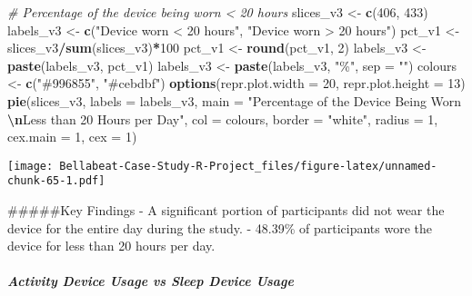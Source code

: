\documentclass[
]{article}
\newenvironment{Shaded}{\begin{snugshade}}{\end{snugshade}}
\newcommand{\AttributeTok}[1]{\textcolor[rgb]{0.13,0.29,0.53}{#1}}
\newcommand{\CommentTok}[1]{\textcolor[rgb]{0.56,0.35,0.01}{\textit{#1}}}
\newcommand{\DecValTok}[1]{\textcolor[rgb]{0.00,0.00,0.81}{#1}}
\newcommand{\FunctionTok}[1]{\textcolor[rgb]{0.13,0.29,0.53}{\textbf{#1}}}
\newcommand{\NormalTok}[1]{#1}
\newcommand{\OtherTok}[1]{\textcolor[rgb]{0.56,0.35,0.01}{#1}}
\newcommand{\SpecialCharTok}[1]{\textcolor[rgb]{0.81,0.36,0.00}{\textbf{#1}}}
\newcommand{\StringTok}[1]{\textcolor[rgb]{0.31,0.60,0.02}{#1}}
\begin{document}
\begin{Shaded}
\begin{Highlighting}[]
\CommentTok{\# Percentage of the device being worn \textless{} 20 hours}
\NormalTok{slices\_v3 }\OtherTok{\textless{}{-}} \FunctionTok{c}\NormalTok{(}\DecValTok{406}\NormalTok{, }\DecValTok{433}\NormalTok{)}
\NormalTok{labels\_v3 }\OtherTok{\textless{}{-}} \FunctionTok{c}\NormalTok{(}\StringTok{"Device worn \textless{} 20 hours"}\NormalTok{, }\StringTok{"Device worn \textgreater{} 20 hours"}\NormalTok{)}
\NormalTok{pct\_v1 }\OtherTok{\textless{}{-}}\NormalTok{ slices\_v3}\SpecialCharTok{/}\FunctionTok{sum}\NormalTok{(slices\_v3)}\SpecialCharTok{*}\DecValTok{100}
\NormalTok{pct\_v1 }\OtherTok{\textless{}{-}} \FunctionTok{round}\NormalTok{(pct\_v1, }\DecValTok{2}\NormalTok{)}
\NormalTok{labels\_v3 }\OtherTok{\textless{}{-}} \FunctionTok{paste}\NormalTok{(labels\_v3, pct\_v1)}
\NormalTok{labels\_v3 }\OtherTok{\textless{}{-}} \FunctionTok{paste}\NormalTok{(labels\_v3, }\StringTok{"\%"}\NormalTok{, }\AttributeTok{sep =} \StringTok{""}\NormalTok{)}
\NormalTok{colours }\OtherTok{\textless{}{-}} \FunctionTok{c}\NormalTok{(}\StringTok{"\#996855"}\NormalTok{, }\StringTok{"\#cebdbf"}\NormalTok{)}
\FunctionTok{options}\NormalTok{(}\AttributeTok{repr.plot.width =} \DecValTok{20}\NormalTok{, }\AttributeTok{repr.plot.height =} \DecValTok{13}\NormalTok{)}
\FunctionTok{pie}\NormalTok{(slices\_v3, }\AttributeTok{labels =}\NormalTok{ labels\_v3,}
    \AttributeTok{main =} \StringTok{"Percentage of the Device Being Worn }\SpecialCharTok{\textbackslash{}n}\StringTok{Less than 20 Hours per Day"}\NormalTok{, }\AttributeTok{col =}\NormalTok{ colours, }\AttributeTok{border =} \StringTok{"white"}\NormalTok{, }\AttributeTok{radius =} \DecValTok{1}\NormalTok{,}
   \AttributeTok{cex.main =} \DecValTok{1}\NormalTok{, }\AttributeTok{cex =} \DecValTok{1}\NormalTok{)}
\end{Highlighting}
\end{Shaded}

\texttt{[image: Bellabeat-Case-Study-R-Project\_files/figure-latex/unnamed-chunk-65-1.pdf]}

\#\#\#\#\#Key Findings - A significant portion of participants did not
wear the device for the entire day during the study. - 48.39\% of
participants wore the device for less than 20 hours per day.

\hypertarget{activity-device-usage-vs-sleep-device-usage}{%
\subparagraph{Activity Device Usage vs Sleep Device
Usage}\label{activity-device-usage-vs-sleep-device-usage}}
\end{document}
